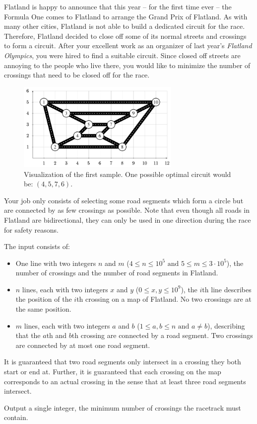 
Flatland is happy to announce that this year -- for the first time ever -- the Formula One comes to Flatland to arrange the Grand Prix of Flatland.
As with many other cities, Flatland is not able to build a dedicated circuit for the race.
Therefore, Flatland decided to close off some of its normal streets and crossings to form a circuit.
After your excellent work as an organizer of last year's \emph{Flatland Olympics}, you were hired to find a suitable circuit.
Since closed off streets are annoying to the people who live there, you would like to minimize the number of crossings that need to be closed off for the race.

\begin{figure}[h]
	\centering
	\includegraphics[width=0.7\textwidth]{sample1}
	\caption{Visualization of the first sample.
		One possible optimal circuit would be: $(4,5,7,6)$.}
\end{figure}

Your job only consists of selecting some road segments which form a circle but are connected by as few crossings as possible.
Note that even though all roads in Flatland are bidirectional, they can only be used in one direction during the race for safety reasons.

\begin{Input}
	The input consists of:
	\begin{itemize}
		\item One line with two integers $n$ and $m$ ($4\leq n \leq10^5\text{ and }5\leq m\leq3\cdot10^5$), the number of crossings and the number of road segments in Flatland.
		\item $n$ lines, each with two integers $x$ and $y$ ($0\leq x,y\leq10^9$), the $i$th line describes the position of the $i$th crossing on a map of Flatland.
		No two crossings are at the same position.
	\item $m$ lines, each with two integers $a$ and $b$ ($1\leq a,b\leq n\text{ and }a\neq b$), describing that the $a$th and $b$th crossing are connected by a road segment.
		Two crossings are connected by at most one road segment.
	\end{itemize}
	It is guaranteed that two road segments only intersect in a crossing they both start or end at.
	Further, it is guaranteed that each crossing on the map corresponds to an actual crossing in the sense that at least three road segments intersect.
\end{Input}

\begin{Output}
	Output a single integer, the minimum number of crossings the racetrack must contain.
\end{Output}

